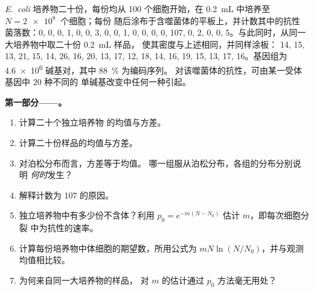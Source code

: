 \begin{problem}
\label{pb:b2:genome-diversification:1}
\emph{E.~coli} 培养物二十份，每份均从 \num{100}
个细胞开始，在 \qty{0.2}{mL} 中培养至 $N = \qty{2e8}{}$ 个细胞；每份
随后涂布于含噬菌体的平板上，并计数其中的抗性
菌落数：0, 0, 0, 1, 0, 0, 3, 0, 0, 1, 0, 0, 0, 0, 107,
0, 2, 0, 0, 5。与此同时，从同一大培养物中取二十份 \qty{0.2}{mL} 样品，
使其密度与上述相同，并同样涂板：
14, 15, 13, 21, 15, 14, 26, 16, 20, 13, 17, 12, 18, 14, 16, 19, 15,
13, 17, 16。基因组为 \qty{4.6e6}{} 碱基对，其中 \qty{88}{\%} 为编码序列。
对该噬菌体的抗性，可由某一受体基因中 \num{20} 种不同的
单碱基改变中任何一种引起。

\medskip
\noindent\textbf{第一部分——。}
\begin{enumerate}
  \item 计算二十个独立培养物
        的均值与方差。
  \item 计算二十份样品的均值与方差。
  \item 对泊松分布而言，方差等于均值。
        哪一组服从泊松分布，各组的分布分别说明
        \emph{何时}发生？
  \item 解释计数为 107 的原因。
  \item 独立培养物中有多少份不含体？利用
        $p_0 = e^{-m(N - N_0)}$ 估计 $m$，即每次细胞分裂
        中为抗性的速率。
  \item 计算每份培养物中体细胞的期望数，所用公式为
        $mN\ln(N/N_0)$，并与观测均值相比较。
  \item 为何来自同一大培养物的样品，
        对 $m$ 的估计通过 $p_0$ 方法毫无用处？
\end{enumerate}


\end{problem}

